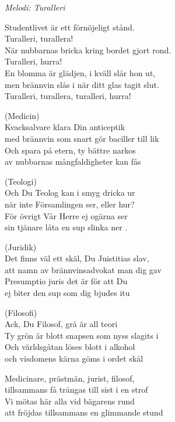 {\footnotesize\textit{Melodi: Turalleri}}\par
\vspace{10pt}
Studentlivet är ett förnöjeligt stånd.\\
Turalleri, turallera!\\
När nubbarnas bricka kring bordet gjort rond.\\
Turalleri, hurra!\\
En blomma är glädjen, i kväll slår hon ut,\\
men brännvin slås i när ditt glas tagit slut.\\
Turalleri, turallera, turalleri, hurra!\par
\vspace{10pt}
(Medicin)\\
Kvacksalvare klara Din anticeptik \\
med brännvin som snart gör baciller till lik\\
Och spara på etern, ty bättre narkos\\
av nubbarnas mångfaldigheter kan fås \par
\vspace{10pt}
(Teologi)\\
Och Du Teolog kan i smyg dricka ur \\
när inte Församlingen ser, eller hur? \\
För övrigt Vår Herre ej ogärna ser\\
sin tjänare låta en sup slinka ner .\par
\vspace{10pt}
(Juridik)\\
Det finns väl ett skäl, Du Juistitias slav, \\
att namn av brännvinsadvokat man dig gav \\
Presumptio juris det är för att Du\\
ej biter den sup som dig bjudes itu \par
\vspace{10pt}
(Filosofi)\\
Ack, Du Filosof, grå är all teori \\
Ty grön är blott snapsen som nyss slagits i \\
Och världsgåtan löses blott i alkohol\\
och visdomens kärna göms i ordet skål \par
\vspace{10pt}
Medicinare, prästmän, jurist, filosof, \\
tillsammans få trängas till sist i en strof \\
Vi mötas här alla vid bägarens rund\\
att fröjdas tillsammans en glimmande stund
